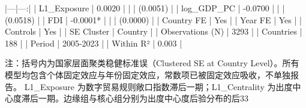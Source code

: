 |---|---:|
| L1_Exposure | 0.0020 |
|  | (0.0051) |
| log_GDP_PC | -0.0700 |
|  | (0.0518) |
| FDI | -0.0001* |
|  | (0.0000) |
| Country FE | Yes |
| Year FE | Yes |
| Controls | Yes |
| SE Cluster | Country |
| Observations (N) | 3293 |
| Countries | 188 |
| Period | 2005-2023 |
| Within R² | 0.003 |

注：括号内为国家层面聚类稳健标准误（Clustered SE at Country Level）。所有模型均包含个体固定效应与年份固定效应，常数项已被固定效应吸收，不单独报告。
L1_Exposure 为数字贸易规则敞口指数滞后一期；L1_Centrality 为出度中心度滞后一期。边缘组与核心组分别为出度中心度后验分布的后33%
